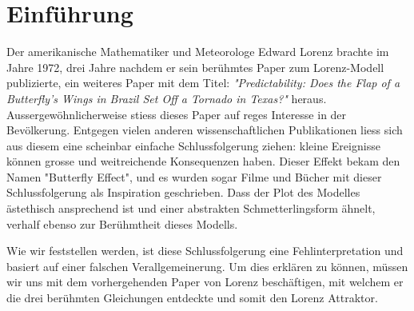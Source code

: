 
\section{Einführung}
Der amerikanische Mathematiker und Meteorologe Edward Lorenz brachte im Jahre 1972, drei Jahre nachdem er sein berühmtes Paper zum Lorenz-Modell publizierte, ein weiteres Paper mit dem Titel: \textit{"Predictability: Does the Flap of a Butterfly’s Wings in Brazil Set Off a Tornado in Texas?"} heraus. Aussergewöhnlicherweise stiess dieses Paper auf reges Interesse in der Bevölkerung. Entgegen vielen anderen wissenschaftlichen Publikationen liess sich aus diesem eine scheinbar einfache Schlussfolgerung ziehen: kleine Ereignisse können grosse und weitreichende Konsequenzen haben. Dieser Effekt bekam den Namen "Butterfly Effect", und es wurden sogar Filme und Bücher mit dieser Schlussfolgerung als Inspiration geschrieben. Dass der Plot des Modelles ästethisch ansprechend ist und einer abstrakten Schmetterlingsform ähnelt, verhalf ebenso zur Berühmtheit dieses Modells.


Wie wir feststellen werden, ist diese Schlussfolgerung eine Fehlinterpretation und basiert auf einer falschen Verallgemeinerung. Um dies erklären zu können, müssen wir uns mit dem vorhergehenden Paper von Lorenz beschäftigen, mit welchem er die drei berühmten Gleichungen entdeckte und somit den Lorenz Attraktor.

